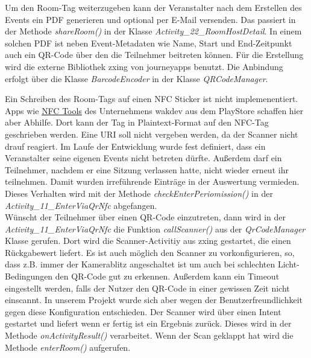 Um den Room-Tag weiterzugeben kann der Veranstalter nach dem Erstellen des Events ein PDF generieren und optional per E-Mail versenden. 
Das passiert in der Methode \textit{shareRoom()} in der Klasse \textit{Activity\_22\_RoomHostDetail}. 
In einem solchen PDF ist neben Event-Metadaten wie Name, Start und End-Zeitpunkt auch ein QR-Code über den die Teilnehmer beitreten können. 
Für die Erstellung wird die externe Bibliothek zxing von journeyapps benutzt. Die Anbindung erfolgt über die Klasse \textit{BarcodeEncoder} in der Klasse \textit{QRCodeManager}.

Ein Schreiben des Room-Tags auf einen NFC Sticker ist nicht implemenentiert.
 Apps wie \href{https://play.google.com/store/apps/details?id=com.wakdev.wdnfc&hl=de&gl=US}{NFC Tools} des Unternehmens wakdev aus dem PlayStore schaffen hier aber Abhilfe. 
Dort kann der Tag in Plaintext-Format auf den NFC-Tag geschrieben werden.
Eine URI soll nicht vergeben werden, da der Scanner nicht drauf reagiert.
Im Laufe der Entwicklung  wurde fest definiert, dass ein Veranstalter seine eigenen Events nicht betreten dürfte.
Außerdem darf ein Teilnehmer, nachdem er eine Sitzung verlassen hatte, nicht wieder erneut ihr teilnehmen.
Damit wurden irreführende Einträge in der Auswertung vermieden. Dieses Verhalten wird mit der Methode \textit{checkEnterPeriomission()} in der \textit{Activity\_11\_EnterViaQrNfc} abgefangen.
\\ 
Wünscht der Teilnehmer über einen QR-Code einzutreten, dann wird in der \textit{Activity\_11\_EnterViaQrNfc} die Funktion \textit{callScanner()} aus der \textit{QrCodeManager} Klasse gerufen. 
Dort wird die Scanner-Activitiy aus zxing gestartet, die einen Rückgabewert liefert. 
Es ist auch möglich den Scanner zu vorkonfigurieren, so, dass z.B. immer der Kamerablitz angeschaltet ist um auch bei schlechten Licht-Bedingungen den QR-Code gut zu erkennen. 
Außerdem kann ein Timeout eingestellt werden, falls der Nutzer den QR-Code in einer gewissen Zeit nicht einscannt.
In unserem Projekt wurde sich aber wegen der Benutzerfreundlichkeit gegen diese Konfiguration entschieden.
Der Scanner wird über einen Intent gestartet und liefert wenn er fertig ist ein Ergebnis zurück.
Dieses wird in der Methode \textit{onActivityResult()} verarbeitet. Wenn der Scan geklappt hat wird die Methode \textit{enterRoom()} aufgerufen. 
